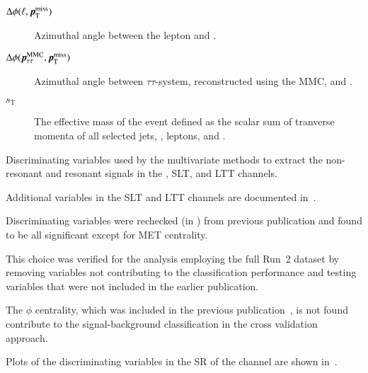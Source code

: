 \begin{description}
\item[$\Delta\phi(\ell, \pTmiss)$] Azimuthal angle between the lepton
  and \pTmiss.

\item[$\Delta\phi(\pTauTau, \pTmiss)$] Azimuthal angle between
  $\tau\tau$-system, reconstructed using the MMC, and \pTmiss.

\item[$s_{\text{T}}$] The effective mass of the event defined as the
  scalar sum of tranverse momenta of all selected jets, \tauhadvis,
  leptons, and \pTmissAbs.
\end{description}

\begin{table}[htbp]
  \centering

  

  \caption{Discriminating variables used by the multivariate methods
    to extract the non-resonant and resonant \HH signals in the
    \hadhad, \lephad SLT, and \lephad LTT channels.}
  \label{tab:mva_inputvar}
\end{table}

Additional variables in the \lephad SLT and LTT channels are
documented in~\cite{ATLAS-CONF-2021-030}.

Discriminating variables were rechecked (in \hadhad) from previous
publication and found to be all significant except for MET centrality.

This choice was verified for the analysis employing the full Run~2
dataset by removing variables not contributing to the classification
performance and testing variables that were not included in the
earlier publication.

The \pTmiss $\phi$ centrality, which was included in the previous
publication~\cite{HIGG-2016-16-witherratum}, is not found contribute
to the signal-background classification in the cross validation
approach.

Plots of the discriminating variables in the SR of the \hadhad channel
are shown in~.

